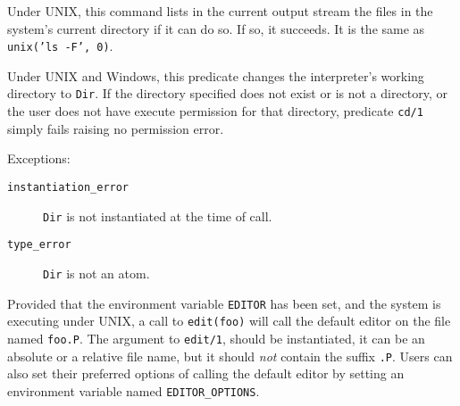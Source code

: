 \begin{description}

    Under UNIX, this command lists in the current output stream the files 
    in the system's current directory if it can do so.  If so, it succeeds.
    It is the same as {\tt unix('ls -F', 0)}.  

    Under UNIX and Windows, this predicate changes the interpreter's
    working directory to {\tt Dir}.  If the directory specified does
    not exist or is not a directory, or the user does not have execute
    permission for that directory, predicate {\tt cd/1} simply fails
    raising no permission error.

    Exceptions:
    \begin{description}
    \item[{\tt instantiation\_error}]
	{\tt Dir} is not instantiated at the time of call.
    \item[{\tt type\_error}]
	{\tt Dir} is not an atom.
    \end{description}

    Provided that the environment variable {\tt EDITOR} has been set,
    and the system is executing under UNIX, 
    a call to {\tt edit(foo)} will call the default editor on the file
    named {\tt foo.P}.  The argument to {\tt edit/1}, should be instantiated,
    it can be an absolute or a relative file name, but it should {\em not}
    contain the suffix {\tt .P}.  Users can also set their preferred options
    of calling the default editor by setting an environment variable named
    {\tt EDITOR\_OPTIONS}.


\end{description}
